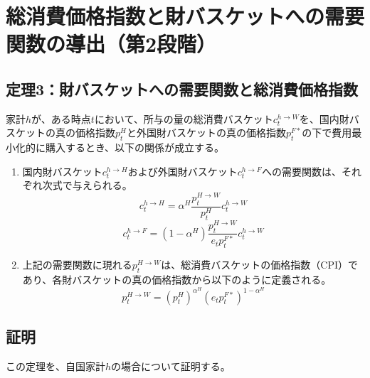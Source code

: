 
\chapter{総消費価格指数と財バスケットへの需要関数の導出（第2段階）}
\label{chap:appendix_cpi_derivation}

\section*{定理3：財バスケットへの需要関数と総消費価格指数}
\label{sec:appendix_cpi_derivation_theorem3}

家計\(h\)が、ある時点\(t\)において、所与の量の総消費バスケット\(c_t^{h\to W}\)を、国内財バスケットの真の価格指数\(p_t^H\)と外国財バスケットの真の価格指数\(p_t^{F*}\)の下で費用最小化的に購入するとき、以下の関係が成立する。
\begin{enumerate}
    \item\label{itm:appendix_cpi_derivation_theorem3_1}国内財バスケット\(c_t^{h\to H}\)および外国財バスケット\(c_t^{h\to F}\)への需要関数は、それぞれ次式で与えられる。
    \begin{equation}
    c_t^{h\to H}=\alpha^H\frac{p_t^{H\to W}}{p_t^H}c_t^{h\to W}
    \label{eq:appendix_cpi_derivation_theorem3_demand_domestic}
    \end{equation}
    \begin{equation}
    c_t^{h\to F}=(1-\alpha^H)\frac{p_t^{H\to W}}{e_tp_t^{F*}}c_t^{h\to W}
    \label{eq:appendix_cpi_derivation_theorem3_demand_foreign}
    \end{equation}
    \item\label{itm:appendix_cpi_derivation_theorem3_2}上記の需要関数に現れる\(p_t^{H\to W}\)は、総消費バスケットの価格指数（CPI）であり、各財バスケットの真の価格指数から以下のように定義される。
    \begin{equation}
    p_t^{H\to W}=(p_t^H)^{\alpha^H}(e_tp_t^{F*})^{1-\alpha^H}
    \label{eq:appendix_cpi_derivation_theorem3_cpi_def}
    \end{equation}
\end{enumerate}

\section*{証明}
\label{sec:appendix_cpi_derivation_proof}

この定理を、自国家計\(h\)の場合について証明する。


